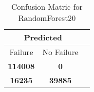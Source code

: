 \begin{table}[] 
\caption{Confusion Matric for RandomForest20} 
\label{Table: Prediction Accuracy-DMDRandomForest20OnlySunEKF-combinationReflectionperfectNoFailurePrediction-Reflection} 
\centering 
\begin{tabular} 
 {@{}ccc@{}} 
\toprule 
\multicolumn{2}{c}{\textbf{Predicted}}
 \\ \midrule 
\multicolumn{1}{|c|}{Failure} & 
\multicolumn{1}{c|}{No Failure}
 \\ \midrule 
\multicolumn{1}{|c|}{\color{green}\textbf{114008}} & 
\multicolumn{1}{c|}{\color{red}\textbf{0}}
 \\ \midrule 
\multicolumn{1}{|c|}{\color{red}\textbf{16235}} & 
\multicolumn{1}{c|}{\color{green}\textbf{39885}}
 \\ \bottomrule 
\end{tabular} 
\end{table} 
